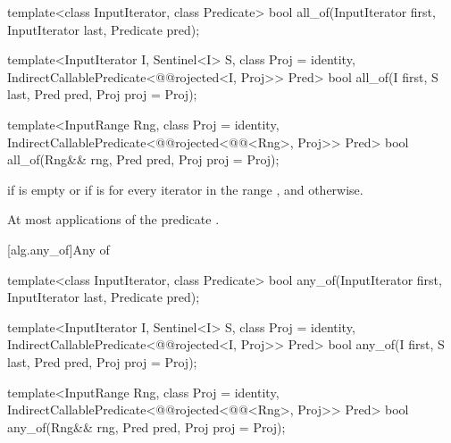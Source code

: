 %
\begin{removedblock}
\begin{itemdecl}
template<class InputIterator, class Predicate>
  bool all_of(InputIterator first, InputIterator last, Predicate pred);
\end{itemdecl}
\end{removedblock}
\begin{addedblock}
\begin{itemdecl}
template<InputIterator I, Sentinel<I> S, class Proj = identity,
    IndirectCallablePredicate<@@rojected<I, Proj>> Pred>
  bool all_of(I first, S last, Pred pred, Proj proj = Proj{});

template<InputRange Rng, class Proj = identity,
    IndirectCallablePredicate<@@rojected<@@<Rng>, Proj>> Pred>
  bool all_of(Rng&& rng, Pred pred, Proj proj = Proj{});
\end{itemdecl}
\end{addedblock}

\begin{itemdescr}
\pnum
\returns {} if
 is empty or if
is  for every iterator  in the range ,
and  otherwise.

\pnum
\complexity At most  applications of the predicate
.
\end{itemdescr}

[alg.any_of]{Any of}

%
\begin{removedblock}
\begin{itemdecl}
template<class InputIterator, class Predicate>
  bool any_of(InputIterator first, InputIterator last, Predicate pred);
\end{itemdecl}
\end{removedblock}
\begin{addedblock}
\begin{itemdecl}
template<InputIterator I, Sentinel<I> S, class Proj = identity,
    IndirectCallablePredicate<@@rojected<I, Proj>> Pred>
  bool any_of(I first, S last, Pred pred, Proj proj = Proj{});

template<InputRange Rng, class Proj = identity,
    IndirectCallablePredicate<@@rojected<@@<Rng>, Proj>> Pred>
  bool any_of(Rng&& rng, Pred pred, Proj proj = Proj{});
\end{itemdecl}
\end{addedblock}

